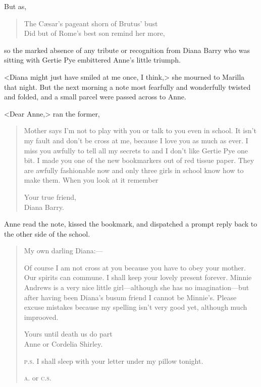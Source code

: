 But as,

\begin{verse}
The Cæsar's pageant shorn of Brutus' bust\\
Did but of Rome's best son remind her more,
\end{verse}

so the marked absence of any tribute or recognition from Diana Barry who was sitting with Gertie Pye embittered Anne's little triumph.

<Diana might just have smiled at me once, I think,> she mourned to Marilla that night. But the next morning a note most fearfully and wonderfully twisted and folded, and a small parcel were passed across to Anne.

<Dear Anne,> ran the former,
\begin{quotation}
\indent Mother says I'm not to play with you or talk to you even in school. It isn't my fault and don't be cross at me, because I love you as much as ever. I miss you awfully to tell all my secrets to and I don't like Gertie Pye one bit. I made you one of the new bookmarkers out of red tissue paper. They are awfully fashionable now and only three girls in school know how to make them. When you look at it remember

\begin{flushright}
Your true friend,\\
Diana Barry.
\end{flushright}
\end{quotation}

Anne read the note, kissed the bookmark, and dispatched a prompt reply back to the other side of the school.

\begin{quotation}
\noindent My own darling Diana:—

\indent Of course I am not cross at you because you have to obey your mother. Our spirits can commune. I shall keep your lovely present forever. Minnie Andrews is a very nice little girl—although she has no imagination—but after having been Diana's busum friend I cannot be Minnie's. Please excuse mistakes because my spelling isn't very good yet, although much improoved.
\begin{flushright}
Yours until death us do part\\
Anne or Cordelia Shirley.
\end{flushright}


\noindent \textsc{p.s.} I shall sleep with your letter under my pillow tonight.

\textsc{a.} or \textsc{c.s.}
\end{quotation}

